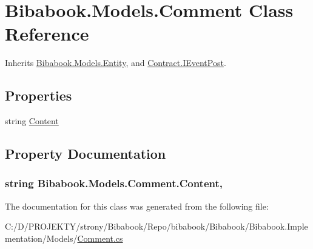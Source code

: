 \hypertarget{class_bibabook_1_1_models_1_1_comment}{}\section{Bibabook.\+Models.\+Comment Class Reference}
\label{class_bibabook_1_1_models_1_1_comment}


Inherits \hyperlink{class_bibabook_1_1_models_1_1_entity}{Bibabook.\+Models.\+Entity}, and \hyperlink{interface_contract_1_1_i_event_post}{Contract.\+I\+Event\+Post}.

\subsection*{Properties}
\begin{DoxyCompactItemize}
\item 
string \hyperlink{class_bibabook_1_1_models_1_1_comment_af2559121cc146bd36ab662ded48a6ef9}{Content}
\end{DoxyCompactItemize}


\subsection{Property Documentation}
\hypertarget{class_bibabook_1_1_models_1_1_comment_af2559121cc146bd36ab662ded48a6ef9}{}
\subsubsection[{Content}]{\setlength{\rightskip}{0pt plus 5cm}string Bibabook.\+Models.\+Comment.\+Content\hspace{0.3cm}{\ttfamily [get]}, {\ttfamily [set]}}\label{class_bibabook_1_1_models_1_1_comment_af2559121cc146bd36ab662ded48a6ef9}


The documentation for this class was generated from the following file\+:\begin{DoxyCompactItemize}
\item 
C\+:/\+D/\+P\+R\+O\+J\+E\+K\+T\+Y/strony/\+Bibabook/\+Repo/bibabook/\+Bibabook/\+Bibabook.\+Implementation/\+Models/\hyperlink{_comment_8cs}{Comment.\+cs}\end{DoxyCompactItemize}
